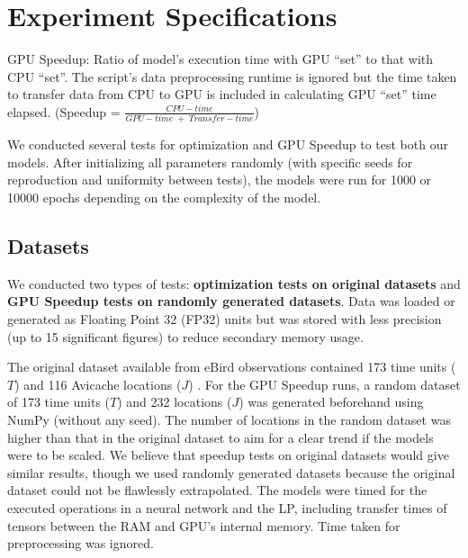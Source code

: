\chapter{Experiment Specifications} \label{sec:Experiment Specifications}
\begin{mydef} \label{def:GPU Speedup}
    GPU Speedup: Ratio of model's execution time with GPU ``set'' to that with CPU ``set''. The script's data preprocessing runtime is ignored but the time taken to transfer data from CPU to GPU is included in calculating GPU ``set'' time elapsed. (Speedup = $\frac{CPU-time}{GPU-time\; +\; Transfer-time}$)
\end{mydef}

We conducted several tests for optimization and GPU Speedup to test both our models. After initializing all parameters randomly (with specific seeds for reproduction and uniformity between tests), the models were run for 1000 or 10000 epochs depending on the complexity of the model.

\section{Datasets} \label{sec:Datasets}
We conducted two types of tests: \textbf{optimization tests on original datasets} and \textbf{GPU Speedup tests on randomly generated datasets}. Data was loaded or generated as Floating Point 32 (FP32) units but was stored with less precision (up to 15 significant figures) to reduce secondary memory usage.

The original dataset available from eBird observations contained 173 time units ($T$) and 116 Avicache locations ($J$) \cite{EBird}. For the GPU Speedup runs, a random dataset of 173 time units ($T$) and 232 locations ($J$) was generated beforehand using NumPy (without any seed). The number of locations in the random dataset was higher than that in the original dataset to aim for a clear trend if the models were to be scaled. We believe that speedup tests on original datasets would give similar results, though we used randomly generated datasets because the original dataset could not be flawlessly extrapolated. The models were timed for the executed operations in a neural network and the LP, including transfer times of tensors between the RAM and GPU's internal memory. Time taken for preprocessing was ignored. 

